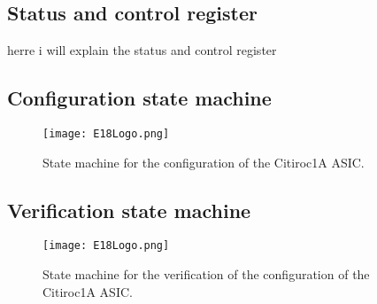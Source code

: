 \subsection{Status and control register}
herre i will explain the status and control register
\subsection{Configuration state machine}
\begin{figure}[H]
    \centering
    \texttt{[image: E18Logo.png]}%
    \caption{State machine for the configuration of the Citiroc1A ASIC.}
    \label{fig:Configuration_state_machine}
\end{figure}
\subsection{Verification state machine}
\begin{figure}[H]
    \centering
    \texttt{[image: E18Logo.png]}%
    \caption{State machine for the verification of the configuration of the Citiroc1A ASIC.}
    \label{fig:Verification_state_machine}
\end{figure}
